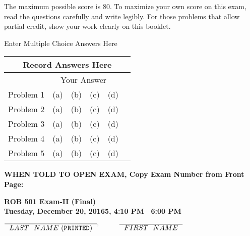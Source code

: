 \documentclass[letterpaper]{article}
\newcommand{\bline}[1]{\underline{\hspace*{#1}}}
\begin{document}
\noindent The maximum possible score is 80. To maximize your own score on this exam, read the questions carefully and write legibly.  For those problems that allow partial credit, show your work clearly on this booklet.

\newpage

\vspace*{4cm}

\begin{center}
\bf

\Large
Enter Multiple Choice Answers Here
\end{center}

\vspace*{4cm}

\begin{center}
\LARGE
\begin{tabular}{|p{1.2in}|p{1.5in}|}
\hline
\multicolumn{2}{|c|}{\textbf{Record Answers Here}}\\
\hline
 & ~~Your Answer\\
\hline
Problem 1 &   (a)~~(b)~~(c)~~(d)~~\\
\hline
Problem 2 &   (a)~~(b)~~(c)~~(d)~~\\
\hline
Problem 3 &   (a)~~(b)~~(c)~~(d)~~\\
\hline
Problem 4 &   (a)~~(b)~~(c)~~(d)~~\\
\hline
Problem 5 &   (a)~~(b)~~(c)~~(d)~~\\
\hline
\end{tabular}
\end{center}

\newpage

\begin{flushright}
{\bf \large WHEN TOLD TO OPEN EXAM, Copy Exam Number from Front Page:}\bline{1.0in}
\end{flushright}

\vspace*{.1in}
\begin{center}
\LARGE \bf
ROB 501 Exam-II (Final)\\
\large
Tuesday, December 20, 20165, 4:10 PM-- 6:00 PM \\
\end{center}

\vspace*{1in}

\begin{center}
$\overline{\mathrm ~~LAST~~NAME~ ({\tt PRINTED})~~}^, \hspace*{.4in} \overline{\mathrm ~~FIRST~~NAME~~}$ \\

\vspace*{1cm}


\end{center}
\end{document}
